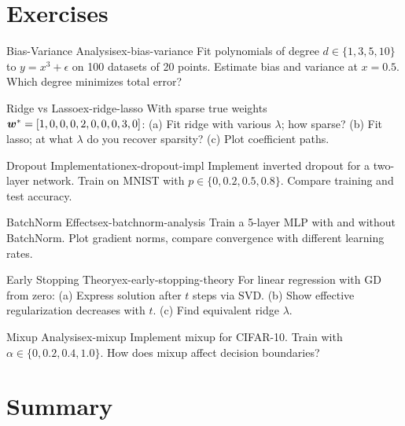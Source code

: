 \documentclass[../../main.tex]{subfiles}
\begin{document}
\section{Exercises}
\label{sec:reg-exercises}

\begin{exercise}{Bias-Variance Analysis}{ex-bias-variance}
Fit polynomials of degree $d \in \{1, 3, 5, 10\}$ to $y = x^3 + \epsilon$ on 100 datasets of 20 points. Estimate bias and variance at $x=0.5$. Which degree minimizes total error?
\end{exercise}

\begin{exercise}{Ridge vs Lasso}{ex-ridge-lasso}
With sparse true weights $\boldsymbol{w}^* = [1,0,0,0,2,0,0,0,3,0]$: (a) Fit ridge with various $\lambda$; how sparse? (b) Fit lasso; at what $\lambda$ do you recover sparsity? (c) Plot coefficient paths.
\end{exercise}

\begin{exercise}{Dropout Implementation}{ex-dropout-impl}
Implement inverted dropout for a two-layer network. Train on MNIST with $p \in \{0, 0.2, 0.5, 0.8\}$. Compare training and test accuracy.
\end{exercise}

\begin{exercise}{BatchNorm Effects}{ex-batchnorm-analysis}
Train a 5-layer MLP with and without BatchNorm. Plot gradient norms, compare convergence with different learning rates.
\end{exercise}

\begin{exercise}{Early Stopping Theory}{ex-early-stopping-theory}
For linear regression with GD from zero: (a) Express solution after $t$ steps via SVD. (b) Show effective regularization decreases with $t$. (c) Find equivalent ridge $\lambda$.
\end{exercise}

\begin{exercise}{Mixup Analysis}{ex-mixup}
Implement mixup for CIFAR-10. Train with $\alpha \in \{0, 0.2, 0.4, 1.0\}$. How does mixup affect decision boundaries?
\end{exercise}

\section{Summary}
\label{sec:reg-summary}
\end{document}
